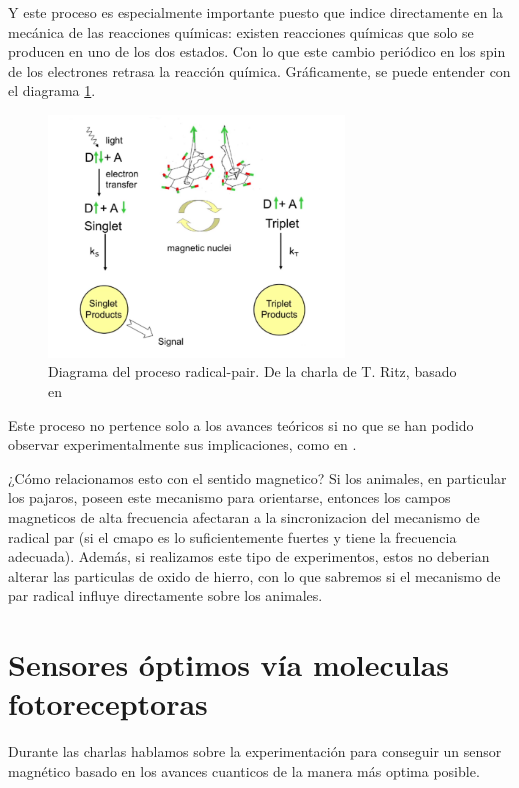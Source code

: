 \documentclass[1p]{elsarticle}
\begin{document}
Y este proceso es especialmente importante puesto que indice directamente en la mecánica de las reacciones químicas: existen reacciones químicas que solo se producen en uno de los dos estados. Con lo que este cambio periódico en los spin de los electrones retrasa la reacción química. Gráficamente, se puede entender con el diagrama \ref{diagrama}.


\begin{figure}
	\centering
	\includegraphics[width=0.7\textwidth]{diagrama}
	\caption{Diagrama del proceso radical-pair. De la charla de T. Ritz, basado en \cite{schulten1978semiclassical}}
	\label{diagrama}
\end{figure}


Este proceso no pertence solo a los avances teóricos si no que se han podido observar experimentalmente sus implicaciones, como en \cite{maeda2008chemical}.

¿Cómo relacionamos esto con el sentido magnetico? Si los animales, en particular los pajaros, poseen este mecanismo para orientarse, entonces los campos magneticos de alta frecuencia afectaran a la sincronizacion del mecanismo de radical par (si el cmapo es lo suficientemente fuertes y tiene la frecuencia adecuada). 
Además, si realizamos este tipo de experimentos, estos no deberian alterar las particulas de oxido de hierro, con lo que sabremos si el mecanismo de par radical influye directamente sobre los animales. 


\section{Sensores óptimos vía moleculas fotoreceptoras}
Durante las charlas hablamos sobre la experimentación para conseguir un sensor magnético basado en los avances cuanticos de la manera más optima posible.  
\end{document}
